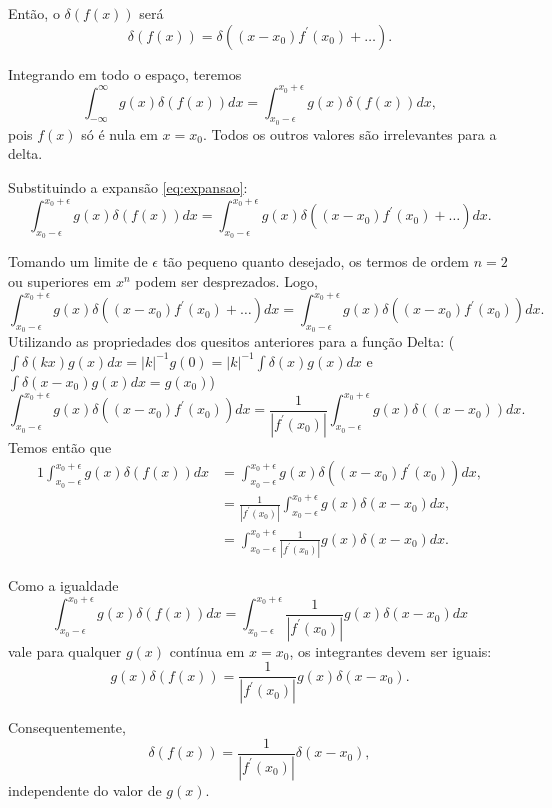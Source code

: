 \documentclass{article}
\begin{document}
Então, o $\delta(f(x))$ será
\begin{equation}\label{eq:expansao}
 \delta(f(x)) = \delta((x - x_0)f^{\prime}(x_0) + \ldots).
\end{equation}

Integrando em todo o espaço, teremos
\begin{equation}
 \int_{-\infty}^{\infty}g(x)\delta(f(x))dx = \int_{x_0 - \epsilon}^{x_0 + \epsilon}g(x)\delta(f(x))dx,
\end{equation}
pois $f(x)$ só é nula em $x = x_0$. Todos os outros valores são irrelevantes para a delta.

Substituindo a expansão \eqref{eq:expansao}:
\begin{equation}
 \int_{x_0 - \epsilon}^{x_0 + \epsilon}g(x)\delta(f(x))dx = \int_{x_0 - \epsilon}^{x_0 + \epsilon} g(x)\delta((x - x_0)f^{\prime}(x_0) + \ldots) dx.
\end{equation}

Tomando um limite de $\epsilon$ tão pequeno quanto desejado, os termos de ordem $n=2$ ou superiores em $x^n$ podem ser desprezados. Logo,
\begin{equation}
 \int_{x_0 - \epsilon}^{x_0 + \epsilon} g(x)\delta((x - x_0)f^{\prime}(x_0) + \ldots) dx = \int_{x_0 - \epsilon}^{x_0 + \epsilon} g(x)\delta((x - x_0)f^{\prime}(x_0)) dx.
\end{equation}
Utilizando as propriedades dos quesitos anteriores para a função Delta:
\newline($\int \delta(kx)g(x)dx = |k|^{-1}g(0) = |k|^{-1}\int \delta(x)g(x)dx$ e $\int \delta(x-x_0)g(x)dx = g(x_0)$)
\begin{equation}
 \int_{x_0 - \epsilon}^{x_0 + \epsilon} g(x)\delta((x - x_0)f^{\prime}(x_0)) dx =
 \frac{1}{|f^{\prime}(x_0)|}\int_{x_0 - \epsilon}^{x_0 + \epsilon} g(x)\delta((x - x_0)) dx.
\end{equation}
Temos então que
\begin{alignat}{1}
 \int_{x_0 - \epsilon}^{x_0 + \epsilon}g(x)\delta(f(x))dx &= \int_{x_0 - \epsilon}^{x_0 + \epsilon} g(x)\delta((x - x_0)f^{\prime}(x_0)) dx,\\
 &= \frac{1}{|f^{\prime}(x_0)|}\int_{x_0 - \epsilon}^{x_0 + \epsilon} g(x)\delta(x-x_0)dx,\\
 &= \int_{x_0 - \epsilon}^{x_0 + \epsilon} \frac{1}{|f^{\prime}(x_0)|} g(x)\delta(x-x_0)dx.
\end{alignat}

Como a igualdade
\begin{equation}
 \int_{x_0 - \epsilon}^{x_0 + \epsilon}g(x)\delta(f(x))dx = \int_{x_0 - \epsilon}^{x_0 + \epsilon} \frac{1}{|f^{\prime}(x_0)|} g(x)\delta(x-x_0)dx
\end{equation}
vale para qualquer $g(x)$ contínua em $x = x_0$, os integrantes devem ser iguais:
\begin{equation}
 g(x)\delta(f(x)) = \frac{1}{|f^{\prime}(x_0)|} g(x)\delta(x-x_0).
\end{equation}

Consequentemente,
\begin{equation}
 \delta(f(x)) = \frac{1}{|f^{\prime}(x_0)|} \delta(x-x_0),
\end{equation}
independente do valor de $g(x)$.
\end{document}
